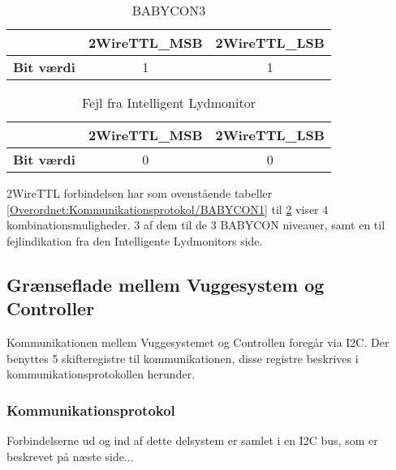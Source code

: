 \begin{table}[H]
	\caption{BABYCON3 }
	\centering
	\begin{tabular}{|l|c|c|}
		\hline 
			&\textbf{2WireTTL\_MSB} & \textbf{2WireTTL\_LSB}     \\ 
		\hline 
		\textbf{Bit værdi} &1 & 1     \\ 
		\hline
	\end{tabular} 
	\label{Overordnet:Kommunikationsprotokol/BABYCON3}
\end{table}


\begin{table}[H]
	\caption{Fejl fra Intelligent Lydmonitor }
	\centering
	\begin{tabular}{|l|c|c|}
		\hline 
			&\textbf{2WireTTL\_MSB} & \textbf{2WireTTL\_LSB}     \\ 
		\hline 
		\textbf{Bit værdi} &0 & 0     \\ 
		\hline
	\end{tabular} 
	\label{Overordnet:Kommunikationsprotokol/IL_fejl}
\end{table}

2WireTTL forbindelsen har som ovenstående tabeller \ref{Overordnet:Kommunikationsprotokol/BABYCON1} til \ref{Overordnet:Kommunikationsprotokol/IL_fejl} viser 4 kombinationsmuligheder. 3 af dem til de 3 BABYCON niveauer, samt en til fejlindikation fra den Intelligente Lydmonitors side. 

\subsection{Grænseflade mellem Vuggesystem og Controller}
Kommunikationen mellem Vuggesystemet og Controllen foregår via I2C. Der benyttes 5 skifteregistre til kommunikationen, disse registre beskrives i kommunikationsprotokollen herunder.

\subsubsection{Kommunikationsprotokol}
Forbindelserne ud og ind af dette delsystem er samlet i en I2C bus, som er beskrevet på næste side...

